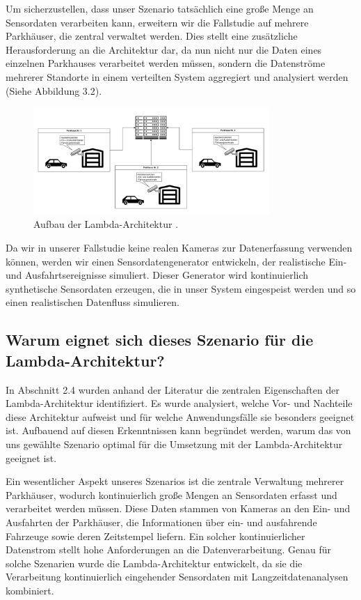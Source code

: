 Um sicherzustellen, dass unser Szenario tatsächlich eine große Menge an Sensordaten verarbeiten kann, erweitern wir die Fallstudie auf mehrere Parkhäuser, die zentral verwaltet werden. Dies stellt eine zusätzliche Herausforderung an die Architektur dar, da nun nicht nur die Daten eines einzelnen Parkhauses verarbeitet werden müssen, sondern die Datenströme mehrerer Standorte in einem verteilten System aggregiert und analysiert werden (Siehe Abbildung 3.2).

\begin{figure}[h] %
    \centering
    \includegraphics[width=0.8\textwidth]{Graphics/Parkhaus2.png} %
    \caption{Aufbau der Lambda-Architektur \cite{entwickler_lambda_kappa}.}
    \label{fig:beispielbild}
\end{figure}

Da wir in unserer Fallstudie keine realen Kameras zur Datenerfassung verwenden können, werden wir einen Sensordatengenerator entwickeln, der realistische Ein- und Ausfahrtsereignisse simuliert. Dieser Generator wird kontinuierlich synthetische Sensordaten erzeugen, die in unser System eingespeist werden und so einen realistischen Datenfluss simulieren.

\subsection{Warum eignet sich dieses Szenario für die Lambda-Architektur?}
In Abschnitt 2.4 wurden anhand der Literatur die zentralen Eigenschaften der Lambda-Architektur identifiziert. Es wurde analysiert, welche Vor- und Nachteile diese Architektur aufweist und für welche Anwendungsfälle sie besonders geeignet ist. Aufbauend auf diesen Erkenntnissen kann begründet werden, warum das von uns gewählte Szenario optimal für die Umsetzung mit der Lambda-Architektur geeignet ist.

Ein wesentlicher Aspekt unseres Szenarios ist die zentrale Verwaltung mehrerer Parkhäuser, wodurch kontinuierlich große Mengen an Sensordaten erfasst und verarbeitet werden müssen. Diese Daten stammen von Kameras an den Ein- und Ausfahrten der Parkhäuser, die Informationen über ein- und ausfahrende Fahrzeuge sowie deren Zeitstempel liefern. Ein solcher kontinuierlicher Datenstrom stellt hohe Anforderungen an die Datenverarbeitung. Genau für solche Szenarien wurde die Lambda-Architektur entwickelt, da sie die Verarbeitung kontinuierlich eingehender Sensordaten mit Langzeitdatenanalysen kombiniert.

